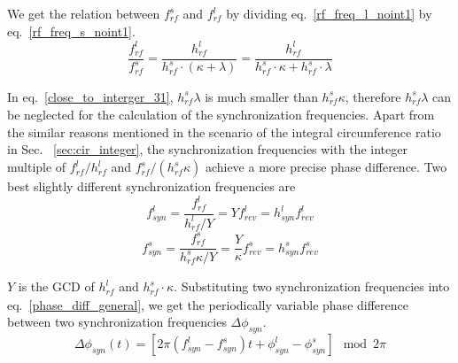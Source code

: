 We get the relation between $f_{\mathit{rf}}^{s}$ and $f_{\mathit{rf}}^{l}$ by dividing eq.~\ref{rf_freq_l_noint1} by eq.~\ref{rf_freq_s_noint1}.
\begin{equation} 
\frac{f_{\mathit{rf}}^{l}}{f_{\mathit{rf}}^{s}}=\frac{h^l_\mathit{rf}}{h^s_\mathit{rf} \cdot ( \kappa+ \lambda)}=\frac{h^l_\mathit{rf}}{h^s_\mathit{rf} \cdot  \kappa+ h^s_\mathit{rf} \cdot \lambda}\label{close_to_interger_31}
\end{equation}

In eq.~\ref{close_to_interger_31}, $h^s_\mathit{rf}\lambda $ is much smaller than $h^s_\mathit{rf}\kappa$, therefore $h^s_\mathit{rf}\lambda $ can be neglected for the calculation of the synchronization frequencies. Apart from the similar reasons mentioned in the scenario of the integral circumference ratio in Sec. ~\ref{sec:cir_integer}, the synchronization frequencies with the integer multiple of $f_{\mathit{rf}}^{l}/h^l_\mathit{rf} $ and $f_{\mathit{rf}}^{s}/(h^s_\mathit{rf}\kappa)$ achieve a more precise phase difference. Two best slightly different synchronization frequencies are 
\begin{equation}
f_{\mathit{syn}}^{l}=\frac{f_{\mathit{rf}}^{l}}{h^l_\mathit{rf}/Y}=Yf_{\mathit{rev}}^{l}=h_\mathit{syn}^\mathit{l}f_{\mathit{rev}}^{l} \label{synch_freq11}
\end{equation}
\begin{equation}
f_{\mathit{syn}}^{s}=\frac{f_{\mathit{rf}}^{s}}{h^s_\mathit{rf}\kappa/Y}=\frac{Y}{\kappa}f_{\mathit{rev}}^{s}=h_\mathit{syn}^\mathit{s}f_{\mathit{rev}}^{s} \label{synch_freq22}
\end{equation}


$Y$ is the GCD of $h^l_\mathit{rf}$ and $h^s_\mathit{rf} \cdot \kappa$. Substituting two synchronization frequencies into eq.~\ref{phase_diff_general}, we get the periodically variable phase difference between two synchronization frequencies $\Delta \phi_\mathit{syn}$.
\begin{equation}
	\Delta \phi_\mathit{syn}(t)=[2\pi(f_{\mathit{syn}}^{l}-f_{\mathit{syn}}^{s})t+\phi_\mathit{syn}^l-\phi^s_\mathit{syn}] \mod 2\pi \label{phase_diff_general1}
\end{equation}

